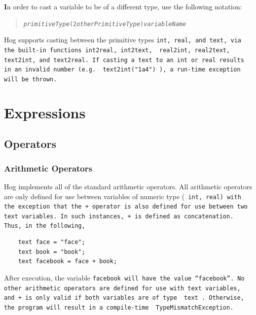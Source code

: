 \documentclass{report}
\begin{document}
\textbf In order to cast a variable to be of a different type, use the
following notation:

\begin{quotation}
      \tt \emph{primitiveType}(2\emph{otherPrimitiveType})\rm \emph{variableName}
\end{quotation}

Hog supports casting between the primitive types \tt int\rm, \tt real\rm, and
\tt text\rm, via the built-in functions \tt int2real\rm, \tt int2text\rm, \tt
real2int\rm, \tt real2text\rm, \tt text2int\rm, and \tt text2real\rm. If
casting a text to an int or real results in an invalid number (e.g. \tt
text2int("1a4") \rm), a run-time exception will be thrown.



\section{Expressions} %
\label{sec:expressions}

\subsection{Operators} %
\label{sub:operators}

\subsubsection{Arithmetic Operators} %
\label{ssub:arithmetic_operators}

Hog implements all of the standard arithmetic operators. All arithmetic
operators are only defined for use between variables of numeric type (\tt
int\rm, \tt real\rm) with the exception that the \tt + \rm operator is also
defined for use between two \tt text \rm variables. In such instances, \tt +
\rm is defined as concatenation. Thus, in the following,

\begin{verbatim}
    text face = "face";
    text book = "book";
    text facebook = face + book;
\end{verbatim}

After execution, the variable \tt facebook \rm will have the value
``facebook''. No other arithmetic operators are defined for use with \tt text
\rm variables, and \tt + \rm is only valid if both variables are of type \tt
text \rm. Otherwise, the program will result in a compile-time \tt
TypeMismatchException\rm. 
\end{document}
